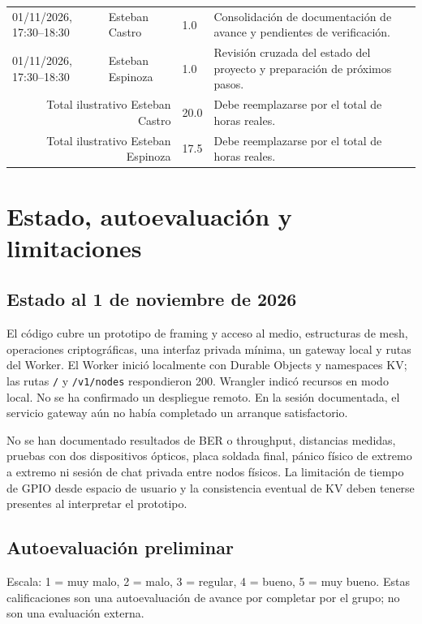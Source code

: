 \documentclass[12pt,a4paper]{article}
\begin{document}
\begin{longtable}{p{}p{}p{}p{}}
01/11/2026, 17:30--18:30 & Esteban Castro & 1.0 & Consolidación de documentación de avance y pendientes de verificación.\\
01/11/2026, 17:30--18:30 & Esteban Espinoza & 1.0 & Revisión cruzada del estado del proyecto y preparación de próximos pasos.\\
\midrule
\multicolumn{2}{r}{Total ilustrativo Esteban Castro} & 20.0 & Debe reemplazarse por el total de horas reales.\\
\multicolumn{2}{r}{Total ilustrativo Esteban Espinoza} & 17.5 & Debe reemplazarse por el total de horas reales.\\
\bottomrule
\end{longtable}

\section{Estado, autoevaluación y limitaciones}

\subsection{Estado al 1 de noviembre de 2026}
El código cubre un prototipo de framing y acceso al medio, estructuras de
mesh, operaciones criptográficas, una interfaz privada mínima, un gateway
local y rutas del Worker. El Worker inició localmente con Durable Objects y
namespaces KV; las rutas \texttt{/} y \texttt{/v1/nodes} respondieron 200.
Wrangler indicó recursos en modo local. No se ha confirmado un despliegue
remoto. En la sesión documentada, el servicio gateway aún no había completado
un arranque satisfactorio.

No se han documentado resultados de BER o throughput, distancias medidas,
pruebas con dos dispositivos ópticos, placa soldada final, pánico físico de
extremo a extremo ni sesión de chat privada entre nodos físicos. La
limitación de tiempo de GPIO desde espacio de usuario y la consistencia
eventual de KV deben tenerse presentes al interpretar el prototipo.

\subsection{Autoevaluación preliminar}
Escala: 1 = muy malo, 2 = malo, 3 = regular, 4 = bueno, 5 = muy bueno. Estas
calificaciones son una autoevaluación de avance por completar por el grupo;
no son una evaluación externa.
\end{document}
